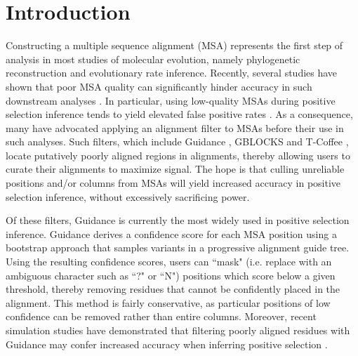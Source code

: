 \documentclass[12pt]{article}
\begin{document}
\section*{Introduction}
Constructing a multiple sequence alignment (MSA) represents the first step of analysis in most studies of molecular evolution, namely phylogenetic reconstruction and evolutionary rate inference. Recently, several studies have shown that poor MSA quality can significantly hinder accuracy in such downstream analyses \citep{Jordan2011, MarkovaRaina2011, Dwivedi2009, Talavera2007, Ogden2006}. In particular, using low-quality MSAs during positive selection inference tends to yield elevated false positive rates \citep{Jordan2011, Privman2012, Schneider2009, Fletcher2010}. As a consequence, many have advocated applying an alignment filter to MSAs before their use in such analyses. Such filters, which include Guidance \citep{Penn2010, Privman2012}, GBLOCKS \citep{Castresana2000} and T-Coffee \citep{Notredame2000}, locate putatively poorly aligned regions in alignments, thereby allowing users to curate their alignments to maximize signal. The hope is that culling unreliable positions and/or columns from MSAs will yield increased accuracy in positive selection inference, without excessively sacrificing power.

Of these filters, Guidance \citep{Penn2010} is currently the most widely used in positive selection inference. Guidance derives a confidence score for each MSA position using a bootstrap approach that samples variants in a progressive alignment guide tree. Using the resulting confidence scores, users can ``mask" (i.e. replace with an ambiguous character such as ``?" or ``N") positions which score below a given threshold, thereby removing residues that cannot be confidently placed in the alignment. This method is fairly conservative, as particular positions of low confidence can be removed rather than entire columns. Moreover, recent simulation studies have demonstrated that filtering poorly aligned residues with Guidance may confer increased accuracy when inferring positive selection \citep{Jordan2011,Privman2012}. 
\end{document}
